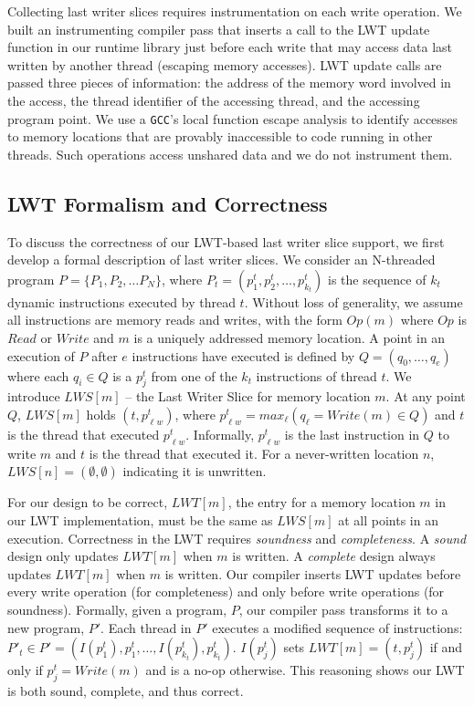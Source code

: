 \documentclass[preprint,9pt]{sigplanconf}
\newcommand{\lwt}{LWT\xspace}
\begin{document}
Collecting last writer slices requires instrumentation on each write operation.
We built an instrumenting compiler pass that inserts a call to the \lwt update
function in our runtime library just before each write that may access data
last written by another thread (escaping memory accesses).  \lwt update 
calls are passed three pieces of information: the address of
the memory word involved in the access, the thread identifier of the accessing
thread, and the accessing program point.   We use a {\tt GCC}'s local function
escape analysis to identify accesses to memory locations that are provably
inaccessible to code running in other threads.  Such operations access unshared
data and we do not instrument them.  



\subsection{\lwt Formalism and Correctness}
\label{sec:lwssoundness}
To discuss the correctness of our \lwt-based last writer slice support, we
first develop a formal description of last writer slices.  We consider an
N-threaded program $P = \{P_1, P_2, \ldots P_N\}$, where $P_t = (p^{t}_{1},
p^{t}_{2}, \ldots, p^{t}_{k_{t}})$ is the sequence of $k_{t}$ dynamic
instructions executed by thread $t$.  Without loss of generality, we assume all
instructions are memory reads and writes, with the form $Op(m)$ where $Op$ is
$Read$ or $Write$ and $m$ is a uniquely addressed memory location.
A point in an execution of $P$ after $e$ instructions have
executed is defined by $Q = (q_{0}, \ldots, q_{e})$ where each $q_{i} \in Q$ is a
$p^{t}_{j}$ from one of the $k_t$ instructions of thread $t$.  We introduce
$LWS[m]$ -- the Last Writer Slice for memory location $m$.   At any point $Q$,
$LWS[m]$ holds $(t,p^{t}_{\ell w})$, where $p^{t}_{\ell w} = max_{\ell}( 
q_{\ell} = Write(m) \in Q)$ and $t$ is the thread that
executed $p^{t}_{\ell w}$. Informally, $p^{t}_{\ell w}$ is the last instruction
in $Q$ to write $m$ and $t$ is the thread that executed it.  For a
never-written location $n$, $LWS[n] = (\emptyset,\emptyset)$ indicating it is
unwritten.

For our design to be correct, $LWT[m]$, the entry for a memory location $m$ in
our \lwt implementation, must be the same as $LWS[m]$ at all points in an
execution.  Correctness in the \lwt requires {\em soundness} and {\em
completeness}.  A {\em sound} design only updates $LWT[m]$ when $m$ is written.
A {\em complete} design always updates $LWT[m]$ when $m$ is written.  Our
compiler inserts \lwt updates before every write operation (for completeness)
and only before write operations (for soundness).  Formally, given a program,
$P$, our compiler pass transforms it to a new program, $P'$.  Each thread in
$P'$ executes a modified sequence of instructions: $P'_{t} \in P' = ( 
I(p^{t}_{1}), p^{t}_{1}, \ldots, I(p^{t}_{k_{t}}), p^{t}_{k_{t}} )$.
$I(p^{t}_{j})$ sets $LWT[m] = (t,p^{t}_{j})$ if and only if $p^{t}_{j} =
Write(m)$ and is a no-op otherwise.  This reasoning shows our \lwt is both
sound, complete, and thus correct.
\end{document}
